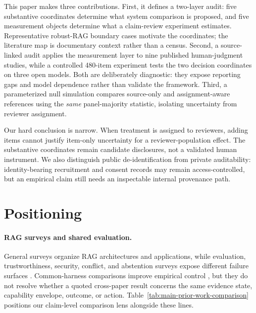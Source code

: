 \documentclass[11pt]{article}
\begin{document}
This paper makes three contributions. First, it defines a two-layer audit:
five substantive coordinates determine what system comparison is proposed,
and five measurement objects determine what a claim-review experiment
estimates. Representative robust-RAG boundary cases motivate the coordinates;
the literature map is documentary context rather than a census. Second, a
source-linked audit applies the measurement layer to nine published
human-judgment studies, while a controlled 480-item experiment tests the two
decision coordinates on three open models. Both are deliberately diagnostic:
they expose reporting gaps and model dependence rather than validate the
framework. Third, a parameterized null simulation compares source-only and
assignment-aware references using the \emph{same} panel-majority statistic,
isolating uncertainty from reviewer assignment.

Our hard conclusion is narrow. When treatment is assigned to reviewers,
adding items cannot justify item-only uncertainty for a reviewer-population
effect. The substantive coordinates remain candidate disclosures, not a
validated human instrument. We also distinguish public de-identification from
private auditability: identity-bearing recruitment and consent records may
remain access-controlled, but an empirical claim still needs an inspectable
internal provenance path.

\section{Positioning}
\label{sec:related}

\paragraph{RAG surveys and shared evaluation.}
General surveys organize RAG architectures and applications, while evaluation,
trustworthiness, security, conflict, and abstention surveys expose different
failure surfaces \citep{ragSurvey2024,ragEvaluationSurvey2024,
trustRAGCompass2024,securityRAGSurvey2026,xuKnowledgeConflicts2024,
wenAbstentionSurvey2025}. Common-harness comparisons improve empirical
control \citep{ragBestPractices2024,alushiRAGComparison2026}, but they do not
resolve whether a quoted cross-paper result concerns the same evidence state,
capability envelope, outcome, or action. Table~\ref{tab:main-prior-work-comparison}
positions our claim-level comparison lens alongside these lines.


\end{document}

